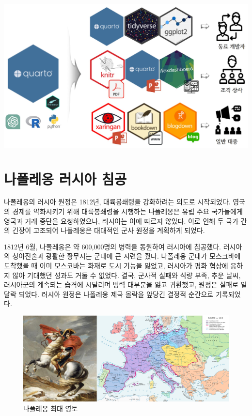 \documentclass[
  letterpaper,
  chapter,a4paper,showtrims,openright,hidelinks]{oblivoir}
\begin{document}
\includegraphics{images/nightingale_communication.jpg}

\hypertarget{uxb098uxd3f4uxb808uxc639-uxb7ecuxc2dcuxc544-uxce68uxacf5}{%
\chapter{나폴레옹 러시아
침공}\label{uxb098uxd3f4uxb808uxc639-uxb7ecuxc2dcuxc544-uxce68uxacf5}}

나폴레옹의 러시아 원정은 1812년, 대륙봉쇄령을 강화하려는 의도로
시작되었다. 영국의 경제를 약화시키기 위해 대륙봉쇄령을 시행하는
나폴레옹은 유럽 주요 국가들에게 영국과 거래 중단을 요청하였으나,
러시아는 이에 따르지 않았다. 이로 인해 두 국가 간의 긴장이 고조되어
나폴레옹은 대대적인 군사 원정을 계획하게 되었다.

1812년 6월, 나폴레옹은 약 600,000명의 병력을 동원하여 러시아에 침공했다.
러시아의 청야전술과 광활한 황무지는 군대에 큰 시련을 줬다. 나폴레옹
군대가 모스크바에 도착했을 때 이미 모스코바는 화재로 도시 기능을 잃었고,
러시아가 평화 협상에 응하지 않아 기대했던 성과도 거둘 수 없었다. 결국,
군사적 실패와 식량 부족, 추운 날씨, 러시아군의 계속되는 습격에 시달리며
병력 대부분을 잃고 귀환했고, 원정은 실패로 일달락 되었다. 러시아 원정은
나폴레옹 제국 몰락을 앞당긴 결정적 순간으로 기록되었다.

\begin{figure}

{\centering \includegraphics{images/about_napoleon.png}

}

\caption{나폴레옹 최대 영토}

\end{figure}
\end{document}
